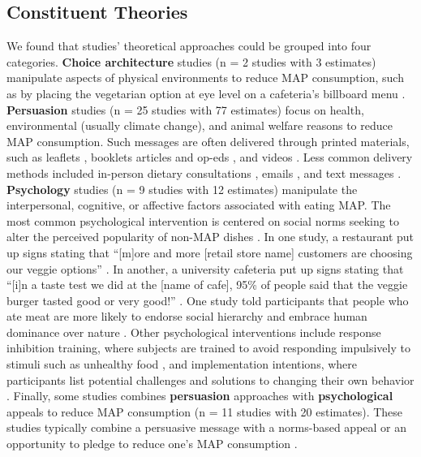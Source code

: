 \documentclass[sn-nature,referee,pdflatex]{sn-jnl}
\begin{document}
\subsection{Constituent Theories}\label{sec2.2}

We found that studies' theoretical approaches could be grouped into four
categories. \textbf{Choice architecture} studies
\citep{andersson2021, kanchanachitra2020} (n = 2 studies with 3
estimates) manipulate aspects of physical environments to reduce MAP
consumption, such as by placing the vegetarian option at eye level on a
cafeteria's billboard menu \citep{andersson2021}. \textbf{Persuasion}
studies
\citep{kanchanachitra2020, aberman2018, abrahamse2007, acharya2004, banerjee2019, bianchi2022, bochmann2017, bschaden2020, carfora2023, hennessy2016, piester2020, cooney2014, cooney2016, feltz2022, haile2021, hatami2018, jalil2023, mathur2021effectiveness, merrill2009, norris2014, peacock2017, polanco2022, sparkman2021, weingarten2022}
(n = 25 studies with 77 estimates) focus on health, environmental
(usually climate change), and animal welfare reasons to reduce MAP
consumption. Such messages are often delivered through printed
materials, such as leaflets \citep{haile2021, polanco2022}, booklets
\citep{bianchi2022} articles and op-eds \citep{sparkman2021, feltz2022},
and videos \citep{sparkman2021, cooney2016, mathur2021effectiveness}.
Less common delivery methods included in-person dietary consultations
\citep{merrill2009}, emails \citep{banerjee2019}, and text messages
\citep{carfora2023}. \textbf{Psychology} studies
\citep{aldoh2023, allen2002, camp2019, coker2022, piester2020, sparkman2020}
(n = 9 studies with 12 estimates) manipulate the interpersonal,
cognitive, or affective factors associated with eating MAP. The most
common psychological intervention is centered on social norms seeking to
alter the perceived popularity of non-MAP dishes \citep{sparkman2020}.
In one study, a restaurant put up signs stating that ``{[}m{]}ore and
more {[}retail store name{]} customers are choosing our veggie options''
\citep{coker2022}. In another, a university cafeteria put up signs
stating that ``{[}i{]}n a taste test we did at the {[}name of cafe{]},
95\% of people said that the veggie burger tasted good or very good!''
\citep{piester2020}. One study told participants that people who ate
meat are more likely to endorse social hierarchy and embrace human
dominance over nature \citep{allen2002}. Other psychological
interventions include response inhibition training, where subjects are
trained to avoid responding impulsively to stimuli such as unhealthy
food \citep{camp2019}, and implementation intentions, where participants
list potential challenges and solutions to changing their own behavior
\citep{aberman2018, shreedhar2021}. Finally, some studies combines
\textbf{persuasion} approaches with \textbf{psychological} appeals to
reduce MAP consumption
\citep{aberman2018, berndsen2005, bertolaso2015, carfora2023, fehrenbach2015, hennessy2016, mathur2021effectiveness, mattson2020, piester2020, shreedhar2021}
(n = 11 studies with 20 estimates). These studies typically combine a
persuasive message with a norms-based appeal
\citep{piester2020, mattson2020} or an opportunity to pledge to reduce
one's MAP consumption \citep{mathur2021effectiveness, shreedhar2021}.
\end{document}
